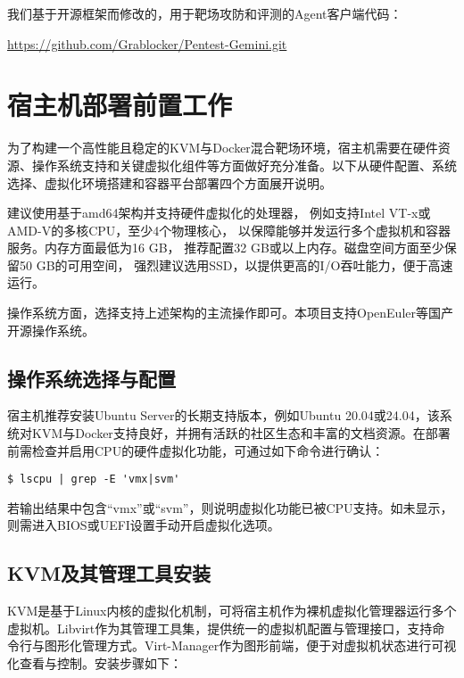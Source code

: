 \documentclass[lang=cn,10pt]{elegantbook}
\begin{document}
我们基于开源框架而修改的，用于靶场攻防和评测的Agent客户端代码：

\href{https://github.com/Grablocker/Pentest-Gemini.git}{https://github.com/Grablocker/Pentest-Gemini.git}



\section{宿主机部署前置工作}

为了构建一个高性能且稳定的KVM与Docker混合靶场环境，宿主机需要在硬件资源、操作系统支持和关键虚拟化组件等方面做好充分准备。以下从硬件配置、系统选择、虚拟化环境搭建和容器平台部署四个方面展开说明。

\begin{proposition}
建议使用基于amd64架构并支持硬件虚拟化的处理器，
例如支持Intel VT-x或AMD-V的多核CPU，至少4个物理核心，
以保障能够并发运行多个虚拟机和容器服务。内存方面最低为16 GB，
推荐配置32 GB或以上内存。磁盘空间方面至少保留50 GB的可用空间，
强烈建议选用SSD，以提供更高的I/O吞吐能力，便于高速运行。

操作系统方面，选择支持上述架构的主流操作即可。本项目支持OpenEuler等国产开源操作系统。
\end{proposition}


\subsection{操作系统选择与配置}

宿主机推荐安装Ubuntu Server的长期支持版本，例如Ubuntu 20.04或24.04，该系统对KVM与Docker支持良好，并拥有活跃的社区生态和丰富的文档资源。在部署前需检查并启用CPU的硬件虚拟化功能，可通过如下命令进行确认：


\begin{verbatim}
$ lscpu | grep -E 'vmx|svm'
\end{verbatim}

若输出结果中包含“vmx”或“svm”，则说明虚拟化功能已被CPU支持。如未显示，则需进入BIOS或UEFI设置手动开启虚拟化选项。

\subsection{KVM及其管理工具安装}

KVM是基于Linux内核的虚拟化机制，可将宿主机作为裸机虚拟化管理器运行多个虚拟机。Libvirt作为其管理工具集，提供统一的虚拟机配置与管理接口，支持命令行与图形化管理方式。Virt-Manager作为图形前端，便于对虚拟机状态进行可视化查看与控制。安装步骤如下：
\end{document}
